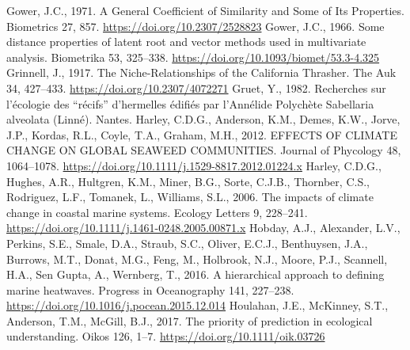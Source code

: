\documentclass[12pt]{report}
\begin{document}
\begin{singlespacing}
Gower, J.C., 1971. A General Coefficient of Similarity and Some of Its Properties. Biometrics 27, 857. \href{https://doi.org/10.2307/2528823}{https://doi.org/10.2307/2528823}
\newline\newline
Gower, J.C., 1966. Some distance properties of latent root and vector methods used in multivariate analysis. Biometrika 53, 325–338. \href{https://doi.org/10.1093/biomet/53.3-4.325}{https://doi.org/10.1093/biomet/53.3-4.325}
\newline\newline
Grinnell, J., 1917. The Niche-Relationships of the California Thrasher. The Auk 34, 427–433. \href{https://doi.org/10.2307/4072271}{https://doi.org/10.2307/4072271}
\newline\newline
Gruet, Y., 1982. Recherches sur l’écologie des “récifs” d’hermelles édifiés par l’Annélide Polychète Sabellaria alveolata (Linné). Nantes.
\newline\newline
Harley, C.D.G., Anderson, K.M., Demes, K.W., Jorve, J.P., Kordas, R.L., Coyle, T.A., Graham, M.H., 2012. EFFECTS OF CLIMATE CHANGE ON GLOBAL SEAWEED COMMUNITIES. Journal of Phycology 48, 1064–1078. \href{https://doi.org/10.1111/j.1529-8817.2012.01224.x}{https://doi.org/10.1111/j.1529-8817.2012.01224.x}
\newline\newline
Harley, C.D.G., Hughes, A.R., Hultgren, K.M., Miner, B.G., Sorte, C.J.B., Thornber, C.S., Rodriguez, L.F., Tomanek, L., Williams, S.L., 2006. The impacts of climate change in coastal marine systems. Ecology Letters 9, 228–241. \href{https://doi.org/10.1111/j.1461-0248.2005.00871.x}{https://doi.org/10.1111/j.1461-0248.2005.00871.x} 
\newline \newline
Hobday, A.J., Alexander, L.V., Perkins, S.E., Smale, D.A., Straub, S.C., Oliver, E.C.J., Benthuysen, J.A., Burrows, M.T., Donat, M.G., Feng, M., Holbrook, N.J., Moore, P.J., Scannell, H.A., Sen Gupta, A., Wernberg, T., 2016. A hierarchical approach to defining marine heatwaves. Progress in Oceanography 141, 227–238. \href{https://doi.org/10.1016/j.pocean.2015.12.014}{https://doi.org/10.1016/j.pocean.2015.12.014}
\newline\newline
Houlahan, J.E., McKinney, S.T., Anderson, T.M., McGill, B.J., 2017. The priority of prediction in ecological understanding. Oikos 126, 1–7. \href{https://doi.org/10.1111/oik.03726}{https://doi.org/10.1111/oik.03726}

\end{singlespacing}
\end{document}

